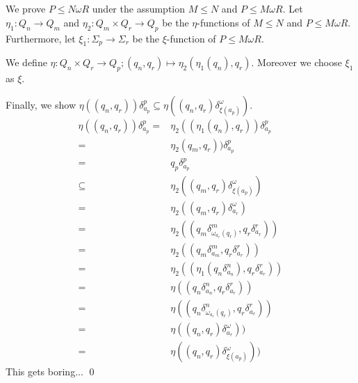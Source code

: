 \documentclass[a4paper,12pt,numbers=noenddot]{scrreport}
\begin{document}
\section{}
We prove $P \leq N \omega R$ under the assumption $M \leq N$ and $P \leq M \omega R$.
Let $\eta_1: Q_n \rightarrow Q_m$ and $\eta_2: Q_m \times Q_r \rightarrow Q_p$ be the $\eta$-functions of $M \leq N$ and $P \leq M \omega R$.
Furthermore, let $\xi_1: \Sigma_p \rightarrow \Sigma_r$ be the $\xi$-function of $P \leq M \omega R$.

We define $\eta : Q_n \times Q_r \rightarrow Q_p; (q_n, q_r) \mapsto \eta_2(\eta_1(q_n), q_r)$.
Moreover we choose $\xi_1$ as $\xi$.

Finally, we show $\eta((q_n,q_r))\delta^p_{a_p} \subseteq \eta((q_n, q_r) \delta^\omega_{\xi(a_p)})$.
\begin{align*}
    \eta((q_n,q_r))\delta^p_{a_p} = & \eta_2((\eta_1 (q_n),q_r))\delta^p_{a_p} \tag{def. $\eta, \eta_1$} \\
                      = & \eta_2(q_m,q_r))\delta^p_{a_p} \tag{def. $\eta_2$} \\
                      = & q_p\delta^p_{a_p} \tag{$P \leq M \omega R$} \\
                      \subseteq & \eta_2((q_m, q_r) \delta^\omega_{\xi(a_p)}) \tag{def. $\xi$}\\
                      = & \eta_2((q_m, q_r) \delta^\omega_{a_r}) \tag{def. $\delta^\omega$}\\
                      = & \eta_2((q_m \delta^m_{\omega_{a_r}(q_r)}, q_r \delta^r_{a_r})) \tag{def. $\omega$}\\
                      = & \eta_2((q_m \delta^m_{a_m}, q_r \delta^r_{a_r})) \tag{$M \leq N$}\\
                      = & \eta_2((\eta_1(q_n \delta^n_{a_n}), q_r \delta^r_{a_r})) \tag{def. $\eta$}\\
                      = & \eta((q_n \delta^n_{a_n}, q_r \delta^r_{a_r})) \tag{def. $\omega$}\\
                      = & \eta((q_n \delta^n_{\omega_{a_r}(q_r)}, q_r \delta^r_{a_r})) \tag{def. $\delta^\omega$}\\
                      = & \eta((q_n, q_r) \delta^\omega_{a_r})) \tag{def. $\xi$}\\
                      = & \eta((q_n, q_r) \delta^\omega_{\xi(a_p)}))
\end{align*}
This gets boring...
\qed
\section{}
\end{document}
